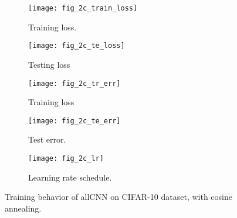 \documentclass[12pt]{article}
\begin{document}
 
  \begin{figure}
     \centering
     \begin{subfigure}[b]{0.3\textwidth}
         \centering
         \texttt{[image: fig\_2c\_train\_loss]}
         \caption{Training loss. }
         \label{fig:y equals x}
     \end{subfigure}
     \hfill
     \begin{subfigure}[b]{0.3\textwidth}
         \centering
         \texttt{[image: fig\_2c\_te\_loss]}
         \caption{Testing loss}
         \label{fig:three sin x}
     \end{subfigure}
     \hfill
     \begin{subfigure}[b]{0.3\textwidth}
         \centering
         \texttt{[image: fig\_2c\_tr\_err]}
         \caption{Training loss}
         \label{fig:five over x}
     \end{subfigure}
      \begin{subfigure}[b]{0.3\textwidth}
         \centering
         \texttt{[image: fig\_2c\_te\_err]}
         \caption{Test error. }
         \label{fig:y equals x}
     \end{subfigure}
     \hfill
     \begin{subfigure}[b]{0.3\textwidth}
         \centering
         \texttt{[image: fig\_2c\_lr]}
         \caption{Learning rate schedule. }
         \label{fig:y equals x}
     \end{subfigure}
     \hfil
        \caption{Training behavior of allCNN on CIFAR-10 dataset, with cosine annealing. }
        \label{fig:three graphs}
\end{figure}

 
 
\end{document}
